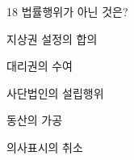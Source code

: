 \begin{question}{18}
법률행위가 아닌 것은?
\begin{choices}
  \item 지상권 설정의 합의
  \item 대리권의 수여
  \item 사단법인의 설립행위
  \item 동산의 가공
  \item 의사표시의 취소
\end{choices}
\end{question}
